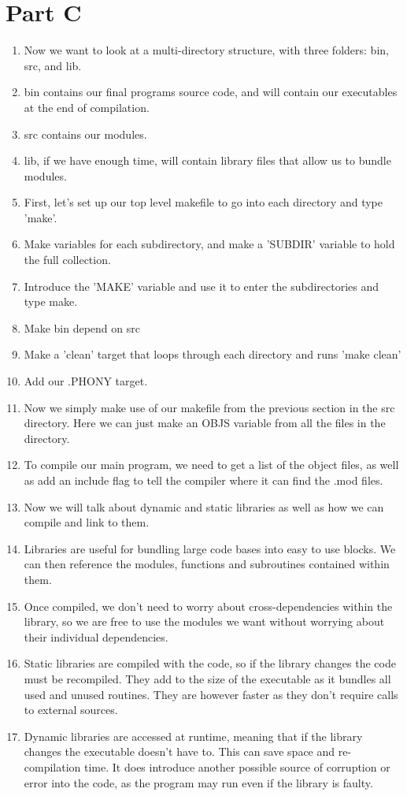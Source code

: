 \documentclass{article}
\begin{document}
\section{Part C}
\begin{enumerate}
\item Now we want to look at a multi-directory structure, with three folders: bin, src, and lib.
\item bin contains our final programs source code, and will contain our executables at the end of compilation.
\item src contains our modules.
\item lib, if we have enough time, will contain library files that allow us to bundle modules.
\item First, let's set up our top level makefile to go into each directory and type 'make'.
\item Make variables for each subdirectory, and make a 'SUBDIR' variable to hold the full collection.
\item Introduce the 'MAKE' variable and use it to enter the subdirectories and type make.
\item Make bin depend on src
\item Make a 'clean' target that loops through each directory and runs 'make clean'
\item Add our .PHONY target.
\item Now we simply make use of our makefile from the previous section in the src directory. Here we can just make an OBJS variable from all the files in the directory.
\item To compile our main program, we need to get a list of the object files, as well as add an include flag to tell the compiler where it can find the .mod files.
\item Now we will talk about dynamic and static libraries as well as how we can compile and link to them.
\item Libraries are useful for bundling large code bases into easy to use blocks. We can then reference the modules, functions and subroutines contained within them.
\item Once compiled, we don't need to worry about cross-dependencies within the library, so we are free to use the modules we want without worrying about their individual dependencies.
\item Static libraries are compiled with the code, so if the library changes the code must be recompiled. They add to the size of the executable as it bundles all used and unused routines. They are however faster as they don't require calls to external sources.
\item Dynamic libraries are accessed at runtime, meaning that if the library changes the executable doesn't have to. This can save space and re-compilation time. It does introduce another possible source of corruption or error into the code, as the program may run even if the library is faulty.
\end{enumerate}
\end{document}
